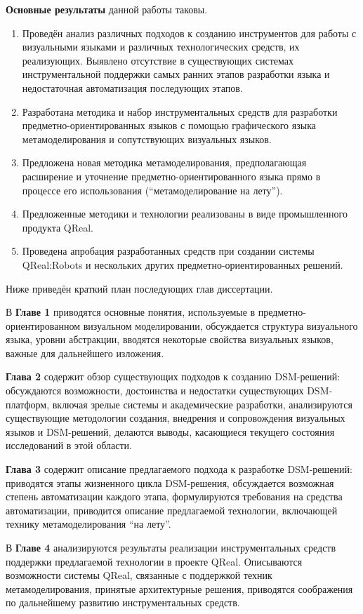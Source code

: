 \textbf{Основные результаты} данной работы таковы.
\begin{enumerate}
	\item Проведён анализ различных подходов к созданию инструментов для работы с визуальными языками и 
		различных технологических средств, их реализующих. Выявлено отсутствие в существующих
		системах инструментальной поддержки самых ранних этапов разработки языка и недостаточная
		автоматизация последующих этапов.
	\item Разработана методика и набор инструментальных средств для разработки 
		предметно-ориентированных языков с помощью графического языка 
		метамоделирования и сопутствующих визуальных языков.
	\item Предложена новая методика метамоделирования, предполагающая расширение 
		и уточнение предметно-ориентированного языка прямо в процессе его 
		использования ("`метамоделирование на лету"'). 
	\item Предложенные методики и технологии реализованы в виде промышленного 
		продукта QReal.
	\item Проведена апробация разработанных средств при создании системы
		QReal:Robots и нескольких других предметно-ориентированных решений.
\end{enumerate}

Ниже приведён краткий план последующих глав диссертации.

В \textbf{Главе 1} приводятся основные понятия, используемые в 
предметно-ориентированном визуальном моделировании, обсуждается структура 
визуального языка, уровни абстракции, вводятся некоторые свойства визуальных 
языков, важные для дальнейшего изложения.

\textbf{Глава 2} содержит обзор существующих подходов к созданию \ac{DSM}-решений: 
обсуждаются возможности, достоинства и недостатки существующих \ac{DSM}-платформ, 
включая зрелые системы и академические разработки, анализируются существующие 
методологии создания, внедрения и сопровождения визуальных языков и \ac{DSM}-решений, 
делаются выводы, касающиеся текущего состояния исследований в этой области.

\textbf{Глава 3} содержит описание предлагаемого подхода к разработке 
\ac{DSM}-решений: приводятся этапы жизненного цикла \ac{DSM}-решения, обсуждается 
возможная степень автоматизации каждого этапа, формулируются требования на 
средства автоматизации, приводится описание предлагаемой технологии, включающей 
технику метамоделирования "`на лету"'.

В \textbf{Главе 4} анализируются результаты реализации инструментальных средств 
поддержки предлагаемой технологии в проекте QReal. Описываются возможности 
системы QReal, связанные с поддержкой техник метамоделирования, принятые 
архитектурные решения, приводятся соображения по дальнейшему развитию 
инструментальных средств.

